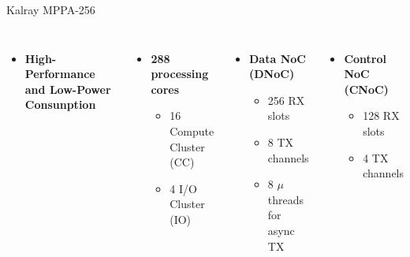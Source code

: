 		\begin{frame}[fragile]{Kalray MPPA-256}

			\vspace{-0.5cm}

			\begin{columns}[totalwidth=\linewidth,t]

					\begin{itemize}
						\item \textbf{High-Performance and Low-Power Consunption}
					\end{itemize}

					\begin{itemize}
						\item \textbf{288 processing cores}
						\begin{itemize}
							\item {16 Compute Cluster (CC)}
							\item {4 I/O Cluster (IO)}
						\end{itemize}
					\end{itemize}

					\begin{itemize}
						\item \textbf{Data NoC (DNoC)}
						\begin{itemize}
							\item 256 RX slots
							\item 8 TX channels
							\item 8 $\mu$threads for async TX
						\end{itemize}
					\end{itemize}

					\begin{itemize}
						\item \textbf{Control NoC (CNoC)}
						\begin{itemize}
							\item 128 RX slots
							\item 4 TX channels
						\end{itemize}
					\end{itemize}

			\end{columns}

			

		\end{frame}

